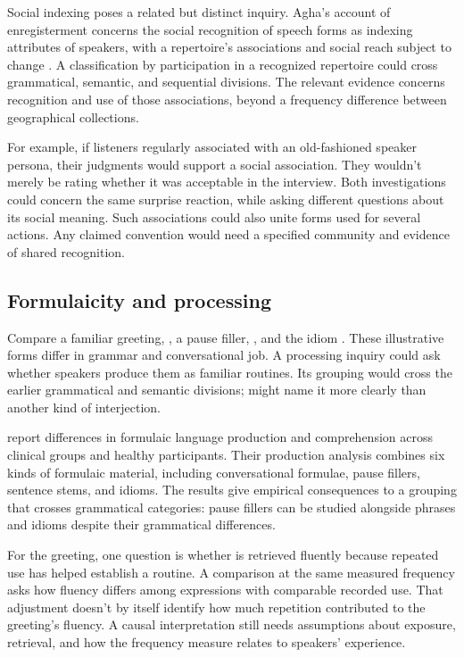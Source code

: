\documentclass[12pt]{article}
\begin{document}
Social indexing poses a related but distinct inquiry. Agha's account
of enregisterment concerns the social recognition of speech forms as
indexing attributes of speakers, with a repertoire's associations and
social reach subject to change \citep[38--40]{agha2005}. A classification
by participation in a recognized repertoire could cross grammatical,
semantic, and sequential divisions. The relevant evidence concerns
recognition and use of those associations, beyond a frequency difference
between geographical collections.

For example, if listeners regularly associated  with an
old-fashioned speaker persona, their judgments would support a social
association. They wouldn't merely be rating whether it was acceptable
in the interview. Both investigations could concern the same surprise
reaction, while asking different questions about its social meaning.
Such associations could also unite forms used for several actions.
Any claimed convention would need a specified community and evidence
of shared recognition.

\subsection{Formulaicity and processing}

Compare a familiar greeting, , a pause filler,
, and the idiom . These illustrative
forms differ in grammar and conversational job. A processing inquiry
could ask whether speakers produce them as familiar routines.
Its grouping would cross the earlier grammatical and semantic divisions;
 might name it more clearly than another
kind of interjection.

\textcite{vanlanckersidtis2015} report differences in formulaic
language production and comprehension across clinical groups and
healthy participants. Their production
analysis combines six kinds of formulaic material, including conversational
formulae, pause fillers, sentence stems, and idioms. The results give
empirical consequences to a grouping that crosses grammatical categories:
pause fillers can be studied alongside phrases and idioms despite
their grammatical differences.

For the greeting, one question is whether  is
retrieved fluently because repeated use has helped establish a routine.
A comparison at the same measured frequency asks how fluency differs
among expressions with comparable recorded use. That adjustment doesn't
by itself identify how much repetition contributed to the greeting's
fluency. A causal interpretation still needs assumptions about exposure,
retrieval, and how the frequency measure relates to speakers' experience.
\end{document}
